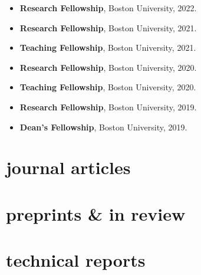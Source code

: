 \documentclass[10pt,oneside]{article}
\begin{document}
\mbox{}\vspace{-\dimexpr\baselineskip\relax}

\begin{itemize}[label={}]
  
  \item \textbf{Research Fellowship}, Boston University, 2022.
        
  \item \textbf{Research Fellowship}, Boston University, 2021.
        
  \item \textbf{Teaching Fellowship}, Boston University, 2021.
        
  \item \textbf{Research Fellowship}, Boston University, 2020.
        
  \item \textbf{Teaching Fellowship}, Boston University, 2020.
        
  \item \textbf{Research Fellowship}, Boston University, 2019.
        
  \item \textbf{Dean's Fellowship}, Boston University, 2019.
        
\end{itemize}


\section{journal articles}

\mbox{}\vspace{-\dimexpr\baselineskip\relax}
\vspace*{-1em}

\uspunctuation

\printbibliography[type=article, heading=none]

\section{preprints \& in review}

\mbox{}\vspace{-\dimexpr\baselineskip\relax}
\vspace*{-1em}
\printbibliography[type=unpublished, heading=none]

\section{technical reports}
\end{document}
